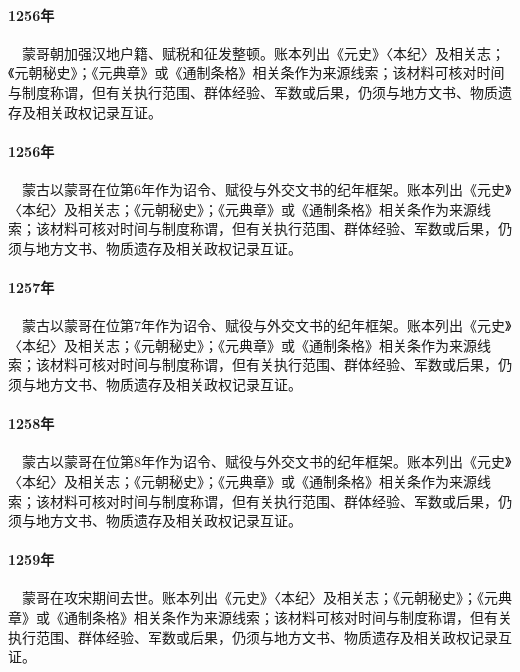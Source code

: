 \paragraph{1256年}　蒙哥朝加强汉地户籍、赋税和征发整顿。账本列出《元史》〈本纪〉及相关志；《元朝秘史》；《元典章》或《通制条格》相关条作为来源线索；该材料可核对时间与制度称谓，但有关执行范围、群体经验、军数或后果，仍须与地方文书、物质遗存及相关政权记录互证。

\paragraph{1256年}　蒙古以蒙哥在位第6年作为诏令、赋役与外交文书的纪年框架。账本列出《元史》〈本纪〉及相关志；《元朝秘史》；《元典章》或《通制条格》相关条作为来源线索；该材料可核对时间与制度称谓，但有关执行范围、群体经验、军数或后果，仍须与地方文书、物质遗存及相关政权记录互证。

\paragraph{1257年}　蒙古以蒙哥在位第7年作为诏令、赋役与外交文书的纪年框架。账本列出《元史》〈本纪〉及相关志；《元朝秘史》；《元典章》或《通制条格》相关条作为来源线索；该材料可核对时间与制度称谓，但有关执行范围、群体经验、军数或后果，仍须与地方文书、物质遗存及相关政权记录互证。

\paragraph{1258年}　蒙古以蒙哥在位第8年作为诏令、赋役与外交文书的纪年框架。账本列出《元史》〈本纪〉及相关志；《元朝秘史》；《元典章》或《通制条格》相关条作为来源线索；该材料可核对时间与制度称谓，但有关执行范围、群体经验、军数或后果，仍须与地方文书、物质遗存及相关政权记录互证。

\paragraph{1259年}　蒙哥在攻宋期间去世。账本列出《元史》〈本纪〉及相关志；《元朝秘史》；《元典章》或《通制条格》相关条作为来源线索；该材料可核对时间与制度称谓，但有关执行范围、群体经验、军数或后果，仍须与地方文书、物质遗存及相关政权记录互证。

